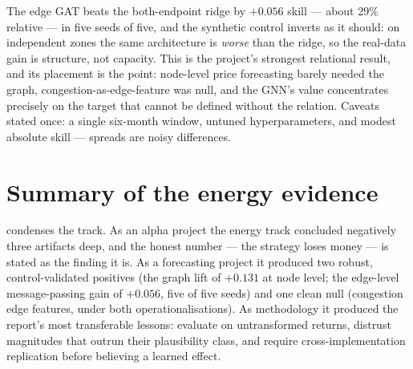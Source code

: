 

The edge GAT beats the both-endpoint ridge by $+0.056$ skill --- about
29\% relative --- in five seeds of five, and the synthetic control
inverts as it should: on independent zones the same architecture is
\emph{worse} than the ridge, so the real-data gain is structure, not
capacity. This is the project's strongest relational result, and its
placement is the point: node-level price forecasting barely needed the
graph, congestion-as-edge-feature was null, and the GNN's value
concentrates precisely on the target that cannot be defined without the
relation. Caveats stated once: a single six-month window, untuned
hyperparameters, and modest absolute skill --- spreads are noisy
differences.

\section{Summary of the energy evidence}
\label{sec:en-summary}



 condenses the track. As an alpha project the
energy track concluded negatively three artifacts deep, and the honest
number --- the strategy loses money --- is stated as the finding it is.
As a forecasting project it produced two robust, control-validated
positives (the graph lift of $+0.131$ at node level; the edge-level
message-passing gain of $+0.056$, five of five seeds) and one clean null
(congestion edge features, under both operationalisations). As
methodology it produced the report's most transferable lessons: evaluate
on untransformed returns, distrust magnitudes that outrun their
plausibility class, and require cross-implementation replication before
believing a learned effect.
